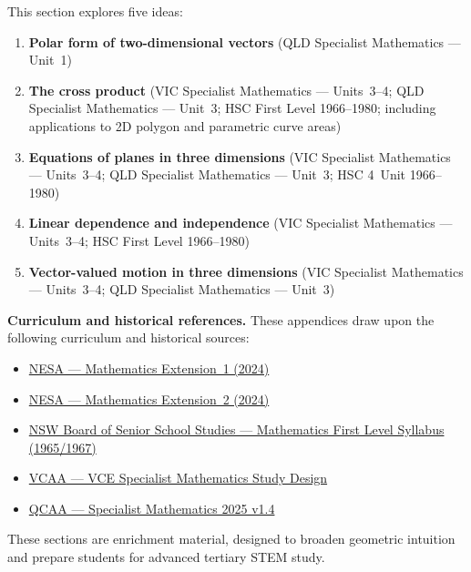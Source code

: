 This section explores five ideas:
\begin{enumerate}[leftmargin=*]
  \item \textbf{Polar form of two-dimensional vectors}
        (QLD Specialist Mathematics --- Unit~1)
  \item \textbf{The cross product}
        (VIC Specialist Mathematics --- Units~3--4;
         QLD Specialist Mathematics --- Unit~3;
         HSC First Level 1966--1980;
         including applications to 2D polygon and parametric curve areas)
  \item \textbf{Equations of planes in three dimensions}
        (VIC Specialist Mathematics --- Units~3--4;
         QLD Specialist Mathematics --- Unit~3;
         HSC 4~Unit 1966--1980)
  \item \textbf{Linear dependence and independence}
        (VIC Specialist Mathematics --- Units~3--4;
         HSC First Level 1966--1980)
  \item \textbf{Vector-valued motion in three dimensions}
        (VIC Specialist Mathematics --- Units~3--4;
         QLD Specialist Mathematics --- Unit~3)
\end{enumerate}

\vspace{0.5em}
\noindent\textbf{Curriculum and historical references.}
These appendices draw upon the following curriculum and historical sources:
\begin{itemize}[leftmargin=*,itemsep=2pt]
  \item \href{https://curriculum.nsw.edu.au/learning-areas/mathematics/mathematics-extension-1-11-12-2024/overview}{NESA --- Mathematics Extension~1 (2024)}
  \item \href{https://curriculum.nsw.edu.au/learning-areas/mathematics/mathematics-extension-2-11-12-2024/overview}{NESA --- Mathematics Extension~2 (2024)}
  \item \href{https://4unitmaths.com/level1syllabus.pdf}{NSW Board of Senior School Studies --- Mathematics First Level Syllabus (1965/1967)}
  \item \href{https://www.vcaa.vic.edu.au/curriculum/vce-curriculum/vce-study-designs/specialist-mathematics/vce-specialist-mathematics}{VCAA --- VCE Specialist Mathematics Study Design}
  \item \href{https://www.qcaa.qld.edu.au/downloads/senior-qce/syllabuses/snr_maths_specialist_25_syll.pdf}{QCAA --- Specialist Mathematics 2025 v1.4}
\end{itemize}

\noindent
These sections are enrichment material, designed to broaden geometric intuition and prepare students for advanced tertiary STEM study.
